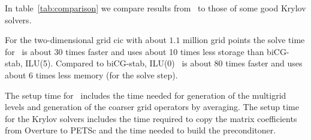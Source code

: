 In table~\ref{tab:comparison} we compare results from \Ogmg\ to those of some good Krylov solvers. 


For the two-dimensional grid cic with about $1.1$ million grid points the solve time for 
\Ogmg\ is about 30 times faster
and uses about 10 times less storage than biCG-stab, ILU(5). Compared to biCG-stab, ILU(0) \Ogmg\
is about 80 times faster and uses about 6 times less memory (for the solve step).

The setup time for \Ogmg\ includes the time needed for generation of the multigrid levels and generation
of the coarser grid operators by averaging. The setup time for the Krylov solvers includes
the time required to copy the matrix coefficients from Overture to PETSc and the time needed
to build the preconditoner.








